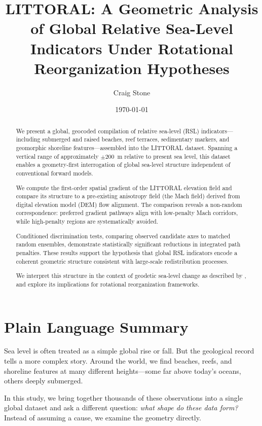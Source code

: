 \documentclass[twocolumn]{article}
\title{LITTORAL: A Geometric Analysis of Global Relative Sea-Level Indicators Under Rotational Reorganization Hypotheses}
\author{Craig Stone}
\date{\today}
\begin{document}
\maketitle

\begin{abstract}
We present a global, geocoded compilation of relative sea-level (RSL) indicators---including submerged and raised beaches, reef terraces, sedimentary markers, and geomorphic shoreline features---assembled into the LITTORAL dataset. Spanning a vertical range of approximately $\pm 200$~m relative to present sea level, this dataset enables a geometry-first interrogation of global sea-level structure independent of conventional forward models. 

We compute the first-order spatial gradient of the LITTORAL elevation field and compare its structure to a pre-existing anisotropy field (the Mach field) derived from digital elevation model (DEM) flow alignment. The comparison reveals a non-random correspondence: preferred gradient pathways align with low-penalty Mach corridors, while high-penalty regions are systematically avoided. 

Conditioned discrimination tests, comparing observed candidate axes to matched random ensembles, demonstrate statistically significant reductions in integrated path penalties. These results support the hypothesis that global RSL indicators encode a coherent geometric structure consistent with large-scale redistribution processes. 

We interpret this structure in the context of geodetic sea-level change as described by \citet{fairbridge1961}, and explore its implications for rotational reorganization frameworks.
\end{abstract}

\section{Plain Language Summary}

Sea level is often treated as a simple global rise or fall. But the geological record tells a more complex story. Around the world, we find beaches, reefs, and shoreline features at many different heights---some far above today's oceans, others deeply submerged. 

In this study, we bring together thousands of these observations into a single global dataset and ask a different question: \emph{what shape do these data form?} Instead of assuming a cause, we examine the geometry directly.
\end{document}
